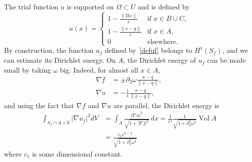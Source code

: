 \documentclass{CUP-JNL-FMP}%
\theoremstyle{definition}
\numberwithin{equation}{section}
\begin{document}
The trial function $u$ is supported on $\Omega\subset U$
and is defined by
\begin{equation}
  u(x) =
  \begin{cases}
    1 - \frac{\|\Pi x\|}{\epsilon} &\text{if $x \in B \cup C$,} \\
    1 - \frac{\|x - q\|}{\epsilon} &\text{if $x \in A$,}\\
    0 &\text{elsewhere}.
  \end{cases}
\end{equation}
By construction, the function $u_f$ defined by~\eqref{defuf} belongs to $H^1(S_f)$, and we can estimate its Dirichlet energy.
On $A$, the Dirichlet energy of $u_f$ can be made small by taking
$\omega$ big. Indeed, for almost all $x \in A$,
\begin{align}\label{eq:nablafonA}
  \nabla f &=
  \pm \partial_2 \omega \frac{x - q}{\|x - q\|}
  ,
  \\
  \nabla u &= -
  \frac{1}{\epsilon}\frac{x - q}{\|x - q\|}
  ,
\end{align}
and using the fact that $\nabla f$ and $\nabla u$ are parallel,
the Dirichlet energy is
\begin{align*}
  \int_{S_f \cap A \times \mathbb{R}} |\nabla u_f|^2 dV
  &= \int_A \frac{|\nabla u|^2}{\sqrt{1 + |\nabla f|^2}}\,dx
  = \frac{1}{\epsilon^2}
  \frac{1}{\sqrt{1 + \partial_2^2 \omega^2}} \mathop{\mbox{Vol}} A\\
  &= \frac{c_1 \epsilon^{n-2}}{\sqrt{1 + \partial_2^2 \omega^2}}
\end{align*}
where $c_1$ is some dimensional constant.
\end{document}
